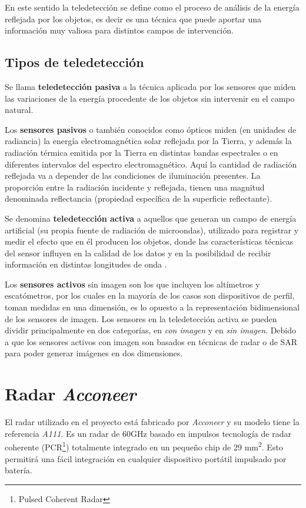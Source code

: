 En este sentido la teledetección se define como el proceso de análisis de la energía reflejada por los objetos, es decir es una técnica que puede aportar una información muy valiosa para distintos campos de intervención. 

\subsection{Tipos de teledetección}

Se llama \textbf{teledetección pasiva} a la técnica aplicada por los sensores que miden las variaciones de la energía procedente de los objetos sin intervenir en el campo natural. 

Los \textbf{sensores pasivos} o también conocidos como ópticos miden (en unidades de radiancia) la energía electromagnética solar reflejada por la Tierra, y además la radiación térmica emitida por la Tierra en distintas bandas espectrales o en diferentes intervalos del espectro electromagnético. Aquí la cantidad de radiación reflejada va a depender de las condiciones de iluminación presentes. La proporción entre la radiación incidente y reflejada, tienen una magnitud denominada reflectancia (propiedad específica de la superficie reflectante).

Se denomina \textbf{teledetección activa} a aquellos que generan un campo de energía artificial (su propia fuente de radiación de microondas), utilizado para registrar y medir el efecto que en él producen los objetos, donde las características técnicas del sensor influyen en la calidad de los datos y  en la posibilidad de recibir información en distintas longitudes de onda \cite{AcevoHerrera2011Apr}. 

Los \textbf{sensores activos} sin imagen son los que incluyen los altímetros y escatómetros, por los cuales en la mayoría de los casos son dispositivos de perfil, toman medidas en una dimensión, es lo opuesto a la representación bidimensional de los sensores de imagen. Los sensores en la teledetección activa se pueden dividir principalmente en dos categorías, en \textit{con imagen} y en \textit{sin imagen}. Debido a que los sensores activos con imagen son basados en técnicas de radar o de SAR para poder generar imágenes en dos dimensiones.

\section{Radar \textit{Acconeer}}

El radar utilizado en el proyecto está fabricado por \textit{Acconeer} y su modelo tiene la referencia \textit{A111}. Es un radar de 60GHz basado en impulsos tecnología de radar coherente (PCR\footnote{Pulsed
Coherent Radar}) totalmente integrado en un pequeño chip de 29 mm\textsuperscript{2}.
Esto permitirá una fácil integración en cualquier dispositivo portátil impulsado por batería.

